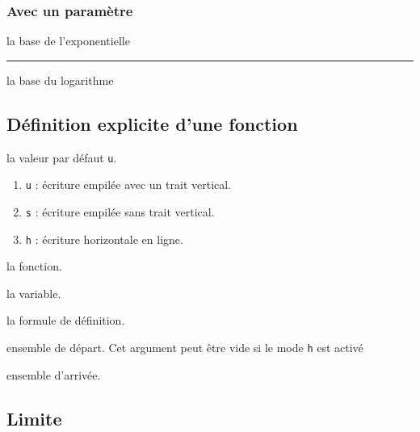 \documentclass[12pt,a4paper]{book}
\theoremstyle{definition}
\newcommand\separation{
	\medskip
	\hfill\rule{0.5\textwidth}{0.75pt}\hfill
	\medskip
}
\begin{document}
{{%




\subsubsection{Avec un paramètre}





\IDarg{} la base de l'exponentielle

\separation


\IDarg{} la base du logarithme





\subsection{Définition explicite d'une fonction}





\IDoption{}  la valeur par défaut \verb+u+. 
\begin{enumerate}
	\item \verb+u+ : écriture empilée avec un trait vertical.
	
	\item \verb+s+ : écriture empilée sans trait vertical.

	\item \verb+h+ : écriture horizontale en ligne.
\end{enumerate}


 la fonction.

 la variable.

 la formule de définition.

 ensemble de départ. Cet argument peut être vide si le mode \verb+h+ est activé

 ensemble d'arrivée.


\subsection{Limite}





}}
\end{document}
